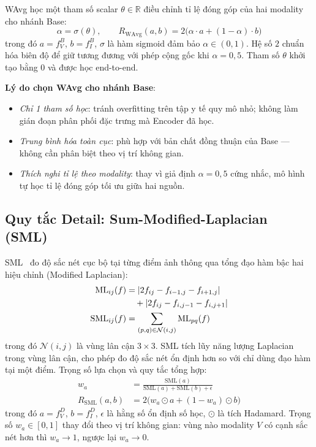 \documentclass[12pt,a4paper]{article}
\begin{document}
WAvg học một tham số scalar $\theta \in \mathbb{R}$ điều chỉnh tỉ lệ đóng góp
của hai modality cho nhánh Base:
\begin{equation}
  \alpha = \sigma(\theta), \qquad
  R_{\mathrm{WAvg}}(a, b) = 2\bigl(\alpha \cdot a + (1-\alpha) \cdot b\bigr)
  \label{eq:wavg}
\end{equation}
trong đó $a = f_V^B$, $b = f_I^B$, $\sigma$ là hàm sigmoid đảm bảo
$\alpha \in (0,1)$. Hệ số $2$ chuẩn hóa biên độ để giữ tương đương với phép cộng
gốc khi $\alpha = 0{,}5$. Tham số $\theta$ khởi tạo bằng 0 và được học end-to-end.

\textbf{Lý do chọn WAvg cho nhánh Base}:
\begin{itemize}\itemsep1pt
  \item \textit{Chỉ 1 tham số học}: tránh overfitting trên tập y tế quy mô nhỏ;
        không làm gián đoạn phân phối đặc trưng mà Encoder đã học.
  \item \textit{Trung bình hóa toàn cục}: phù hợp với bản chất đồng thuận của
        Base --- không cần phân biệt theo vị trí không gian.
  \item \textit{Thích nghi tỉ lệ theo modality}: thay vì giả định $\alpha=0{,}5$
        cứng nhắc, mô hình tự học tỉ lệ đóng góp tối ưu giữa hai nguồn.
\end{itemize}

\subsection{Quy tắc Detail: Sum-Modified-Laplacian (SML)}

SML~\cite{huang2007sml} đo độ sắc nét cục bộ tại từng điểm ảnh thông qua tổng
đạo hàm bậc hai hiệu chỉnh (Modified Laplacian):
\begin{align}
  \mathrm{ML}_{ij}(f) &= |2f_{ij} - f_{i-1,j} - f_{i+1,j}| \notag \\
                       &\quad + |2f_{ij} - f_{i,j-1} - f_{i,j+1}| \label{eq:ml}\\
  \mathrm{SML}_{ij}(f) &= \sum_{(p,q)\in\mathcal{N}(i,j)} \mathrm{ML}_{pq}(f)
  \label{eq:sml-map}
\end{align}
trong đó $\mathcal{N}(i,j)$ là vùng lân cận $3\times3$. SML tích lũy năng lượng
Laplacian trong vùng lân cận, cho phép đo độ sắc nét ổn định hơn so với chỉ dùng
đạo hàm tại một điểm. Trọng số lựa chọn và quy tắc tổng hợp:
\begin{align}
  w_a &= \frac{\mathrm{SML}(a)}{\mathrm{SML}(a)+\mathrm{SML}(b)+\epsilon}
  \label{eq:weight}\\
  R_{\mathrm{SML}}(a,b) &= 2\bigl(w_a \odot a + (1-w_a) \odot b\bigr)
  \label{eq:sml-rule}
\end{align}
trong đó $a = f_V^D$, $b = f_I^D$, $\epsilon$ là hằng số ổn định số học,
$\odot$ là tích Hadamard. Trọng số $w_a \in [0,1]$ thay đổi theo vị trí không
gian: vùng nào modality $V$ có cạnh sắc nét hơn thì $w_a \to 1$, ngược lại
$w_a \to 0$.
\end{document}
